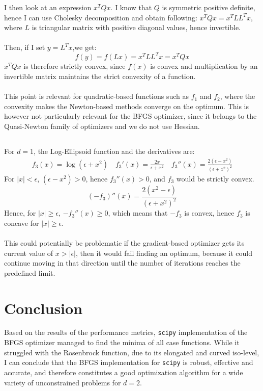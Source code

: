 \documentclass[a4paper]{article}
\begin{document}
I then look at an expression $x^TQx$. I know that $Q$ is symmetric
positive definite, hence I can use Cholesky decomposition and obtain following:
$x^TQx = x^TLL^Tx$, where $L$ is triangular matrix with positive diagonal
values, hence invertible.\\\\
Then, if I set $y=L^Tx$,we get:
\[
f(y) = f(Lx) = x^TLL^Tx = x^TQx
\]
$x^TQx$ is therefore strictly convex, since $f(x)$ is convex and 
multiplication by an invertible matrix maintains the strict convexity of a function. \\\\
This point is relevant for quadratic-based functions such as $f_1$ and $f_2$,
where the convexity makes the Newton-based methods converge on the optimum.
This is however not particularly relevant for the BFGS optimizer, since it
belongs to the Quasi-Newton family of optimizers and we do not use
Hessian.

\subsection{}
For $d=1$, the Log-Ellipsoid function and the derivatives are:
\begin{align*}
  f_3(x) = \log(\epsilon + x^2) \quad
  f_3'(x) = \frac{2x}{\epsilon + x^2} \quad
  f_3''(x) = \frac{2(\epsilon - x^2)}{(\epsilon + x^2)^2}
\end{align*}
For $|x| < \epsilon$, $(\epsilon - x^2) > 0$, hence $f_3''(x) > 0$, and $f_3$
would be strictly convex.
\[
(-f_3)''(x) = \frac{2(x^2 - \epsilon)}{(\epsilon + x^2)^2}
\]
Hence, for $|x| \geq \epsilon$, $-f_3''(x) \geq 0$, which means that $-f_3$ is
convex, hence $f_3$ is concave for $|x| \geq \epsilon$.\\\\
This could potentially be problematic if the gradient-based optimizer gets its current value of
$x>|\epsilon|$, then it would fail finding an optimum, because it could continue
moving in that direction until the number of iterations reaches the predefined limit. 

\section{Conclusion}
Based on the results of the performance metrics,
\texttt{scipy} implementation of the BFGS optimizer managed to find the minima
of all case functions. While it struggled with the Rosenbrock function, due to its
elongated and curved iso-level, I can conclude that the BFGS implementation for
\texttt{scipy} is robust, effective and accurate, and therefore constitutes a
good optimization algorithm for a wide variety of unconstrained problems for $d=2$.
\end{document}
